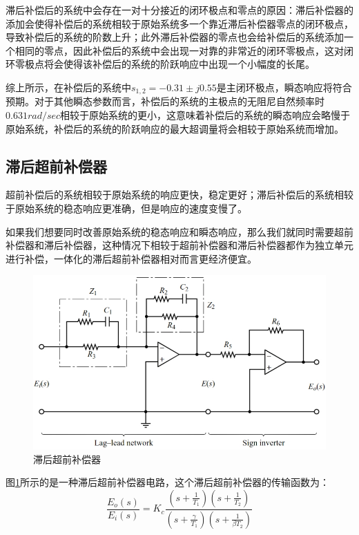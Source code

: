 \documentclass{article}
\numberwithin{equation}{section}
\numberwithin{figure}{section}
\begin{document}
滞后补偿后的系统中会存在一对十分接近的闭环极点和零点的原因：滞后补偿器的添加会使得补偿后的系统相较于原始系统多一个靠近滞后补偿器零点的闭环极点，导致补偿后的系统的阶数上升；此外滞后补偿器的零点也会给补偿后的系统添加一个相同的零点，因此补偿后的系统中会出现一对靠的非常近的闭环零极点，这对闭环零极点将会使得该补偿后的系统的阶跃响应中出现一个小幅度的长尾。

综上所示，在补偿后的系统中$s_{1,2}=-0.31 \pm j0.55$是主闭环极点，瞬态响应将符合预期。对于其他瞬态参数而言，补偿后的系统的主极点的无阻尼自然频率时$0.631rad/sec$相较于原始系统的更小，这意味着补偿后的系统的瞬态响应会略慢于原始系统，补偿后的系统的阶跃响应的最大超调量将会相较于原始系统而增加。

\subsection{滞后超前补偿器}

超前补偿后的系统相较于原始系统的响应更快，稳定更好；滞后补偿后的系统相较于原始系统的稳态响应更准确，但是响应的速度变慢了。

如果我们想要同时改善原始系统的稳态响应和瞬态响应，那么我们就同时需要超前补偿器和滞后补偿器，这种情况下相较于超前补偿器和滞后补偿器都作为独立单元进行补偿，一体化的滞后超前补偿器相对而言更经济便宜。

\begin{figure}
    \centering
    \includegraphics[width=.6\textwidth]{Chapter6/leadandlagcompensator.png} %
    \caption{滞后超前补偿器} %
    \label{leadandlagcompensator} %
\end{figure}

图\ref{leadandlagcompensator}所示的是一种滞后超前补偿器电路，这个滞后超前补偿器的传输函数为：
\begin{equation}
    \frac{E_o(s)}{E_i(s)}=K_c\frac{(s+\frac{1}{T_1})(s+\frac{1}{T_2})}{(s+\frac{\gamma}{T_1})(s+\frac{1}{\beta T_2})}
\end{equation}
\end{document}
